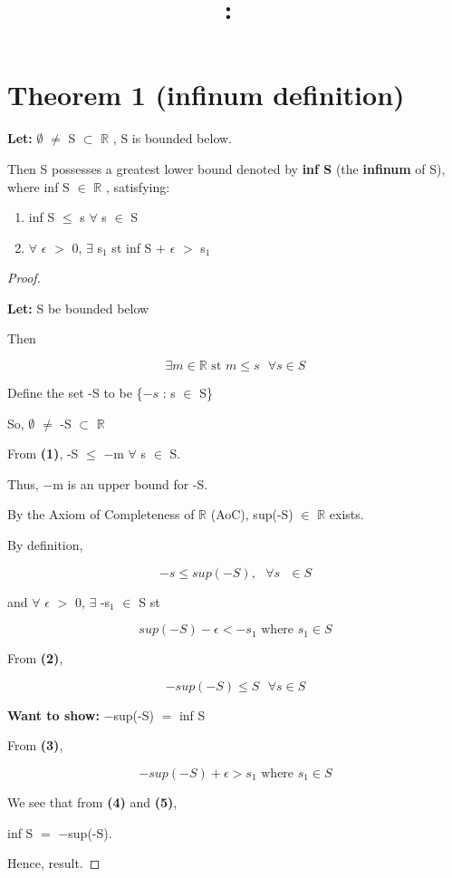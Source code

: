 \documentclass{article}
\title{
    \vspace{2in}
    \textmd{\textbf{\hmwkClass:\ \hmwkTitle}}\\
    \normalsize\vspace{0.1in}\small\vspace{0.1in}\large{\textit{\hmwkClassInstructor}}
    \vspace{3in}
}
\author{\hmwkAuthorName}
\date{}
\newcommand{\mt}[1]{\ensuremath{#1}}
\newcommand\bsc[2][\DefaultOpt]{%
  \def\DefaultOpt{#2}%
  \section[#1]{#2}%
}
\newcommand{\bgpf}{\begin{proof} $ $\newline}
\newcommand{\elist}{\end{enumerate}}
\newcommand{\bilist}{\begin{enumerate}[label=\roman*)]}
\newcommand{\lt}[1]{\textbf{Let: } #1}
\newcommand{\wts}[1]{\textbf{Want to show: } #1}
\newcommand{\bpth}[1]{\textbf{(#1)}}
\newcommand{\step}[2]{\begin{equation}\tag{#2}#1\end{equation}}
\newcommand{\epf}{\end{proof}}
\newcommand{\br}{\mt{\mathbb{R}} }       %
\newcommand{\ep}{\mt{\epsilon} }         %
\newcommand{\fa}{\mt{\forall} }          %
\newcommand{\mem}{\mt{\in} }
\newcommand{\exs}{\mt{\exists} }
\newcommand{\es}{\mt{\emptyset} }        %
\newcommand{\sbs}{\mt{\subset} }         %
\newcommand{\eql}{\mt{=} }
\newcommand{\uw}[2]{#1\mt{_{#2}}}
\begin{document}
\bsc{Theorem 1 (infinum definition)}{

\lt{\es $\neq$ S \sbs \br, S is bounded below.}

Then S possesses a greatest lower bound denoted by \textbf{inf S} (the \textbf{infinum} of S), where inf S \mem \br, satisfying:

\bilist
\item inf S $\leq$ s \fa s \mem S
\item \fa \ep $>$ 0, \exs \uw{s}{1}  st  inf S $+$ \ep $>$ \uw{s}{1}
\elist

\bgpf

\lt{S be bounded below}

Then 

\step{\exs m \mem \br \textrm{  st  }m \leq s \textrm{  }\fa s \mem S}{1}

Define the set -S to be \{$-s$ : s \mem S\}

So, \es $\neq$ -S \sbs \br

From \bpth{1}, -S $\leq$ $-$m \fa s \mem S.

Thus, $-$m is an upper bound for -S.

By the Axiom of Completeness of \br (AoC), sup(-S) \mem \br exists.

By definition,

\step{-s \leq sup(-S), \textrm{  } \fa s \textrm{ } \mem S}{2}

and \fa \ep $>$ 0, \exs \uw{-s}{1} \mem S  st

\step{sup(-S) - \ep < \uw{-s}{1} \textrm{  where  } \uw{s}{1} \mem S}{3}

From \bpth{2}, 

\step{-sup(-S) \leq S \textrm{  } \fa s \mem S}{4}

\wts{$-$sup(-S) \eql inf S}

From \bpth{3},

\step{-sup(-S) + \ep > \uw{s}{1} \textrm{  where  } \uw{s}{1} \mem S }{5}

We see that from \bpth{4} and \bpth{5},

inf S \eql $-$sup(-S).

Hence, result.
\epf

}

\newpage
\end{document}
